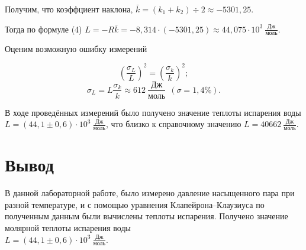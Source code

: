 \documentclass[a4paper,12pt]{article} %
\theoremstyle{plain} %
\theoremstyle{definition} %
\theoremstyle{remark} %
\begin{document}
Получим, что коэффциент наклона, $\bar{k}=(k_1+k_2)\div 2\approx-5301,25$.

Тогда по формуле (4) $L=-R\bar{k}=-8,314\cdot(-5301,25)\approx44,075\cdot 10^3~\frac{\text{Дж}}{\text{моль}}$.

Оценим возможную ошибку измерений

\[\left(\dfrac{\sigma_L}{L}\right)^2=\left(\dfrac{\sigma_{k}}{k}\right)^2; \]
\[\sigma_L=L\dfrac{\sigma_{k}}{k}\approx612~\frac{\text{Дж}}{\text{моль}}~~(\sigma= 1,4\%). \]


В ходе проведённых измерений было получено значение теплоты испарения воды \\
$L=(44,1 \pm 0,6) \cdot 10^3~\frac{\text{Дж}}{\text{моль}}$, что близко к справочному значению $L=40662~\frac{\text{Дж}}{\text{моль}}$.

\section*{Вывод}
В данной лабораторной работе, было измерено давление насыщенного пара при разной температуре, и с помощью уравнения Клапейрона–Клаузиуса по полученным данным были вычислены теплоты испарения. Получено значение молярной теплоты испарения воды \\ $L=(44,1 \pm 0,6) \cdot 10^3~\frac{\text{Дж}}{\text{моль}}$. 
\end{document}

